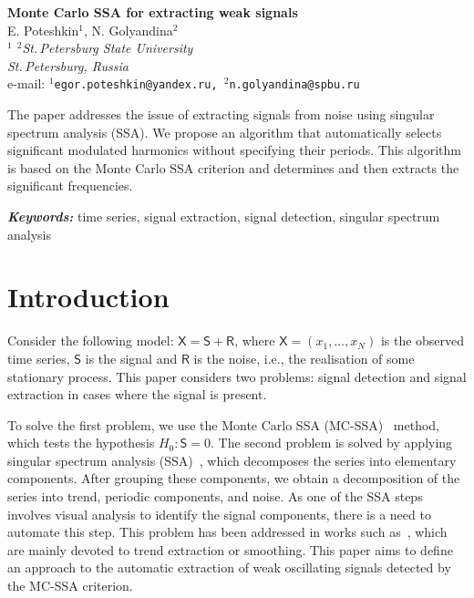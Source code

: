\documentclass[12pt]{article}
\providecommand{\keywords}[1]
{
\vspace{2mm}\hspace{20pt}\textbf{\textit{Keywords:}} #1
}
\providecommand{\abskeyw}[2]
{
\begin{small}
\begin{adjustwidth}{10mm}{10mm}
\vspace{1mm}\hspace{20pt}#1

\keywords{#2}
\end{adjustwidth}
\end{small}
}
\begin{document}
\begin{center}
{\Large\bf Monte Carlo SSA for extracting weak signals}\\\vspace{2mm} {\sc E. Poteshkin$^1$, N. Golyandina$^2$}\\\vspace{2mm}
{\it $^{1}$ $^{2}$St.\,Petersburg State University\\
St.\,Petersburg, Russia\\} e-mail: {\tt $^1$egor.poteshkin@yandex.ru,
$^2$n.golyandina@spbu.ru}

\abskeyw{The paper addresses the issue of extracting signals from noise using singular spectrum analysis (SSA). We propose an algorithm that automatically selects significant modulated harmonics without specifying their periods. This algorithm is based on the Monte Carlo SSA criterion and determines and then extracts the significant frequencies.}{time series, signal extraction, signal detection, singular spectrum analysis}
\end{center}

\section{Introduction}

Consider the following model: $\mathsf{X}=\mathsf{S}+\mathsf{R}$, where $\mathsf{X} = (x_1,\ldots,x_N)$ is the observed time series, $\mathsf{S}$ is the signal and $\mathsf{R}$ is the noise, i.e., the realisation of some stationary process. This paper considers two problems: signal detection and signal extraction in cases where the signal is present.

To solve the first problem, we use the Monte Carlo SSA (MC-SSA)~\cite{AllenSmith96} method, which tests the hypothesis $H_0:\mathsf{S}=0$. The second problem is solved by applying singular spectrum analysis (SSA)~\cite{Broomhead1986, ssa2001}, which decomposes the series into elementary components. After grouping these components, we obtain a decomposition of the series into trend, periodic components, and noise. As one of the SSA steps involves visual analysis to identify the signal components, there is a need to automate this step. This problem has been addressed in works such as~\cite{alexandrov, Kalantari2019, circSSA, autoSSA}, which are mainly devoted to trend extraction or smoothing. This paper aims to define an approach to the automatic extraction of weak oscillating signals detected by the MC-SSA criterion.
\end{document}
